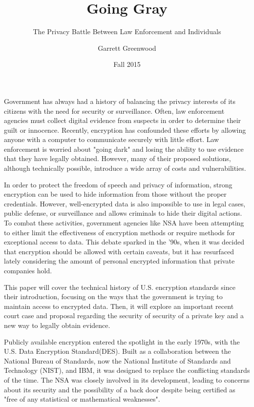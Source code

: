 \documentclass[12pt]{turabian-researchpaper}
\title{Going Gray}
\subtitle{The Privacy Battle Between Law Enforcement and Individuals}
\author{Garrett Greenwood}
\date{Fall 2015}
\begin{document}
\maketitle


Government has always had a history of balancing the privacy interests of its citizens with the need for security or surveillance.
Often, law enforcement agencies must collect digital evidence from suspects in order to determine their guilt or innocence.
Recently, encryption has confounded these efforts by allowing anyone with a computer to communicate securely with little effort.
Law enforcement is worried about "going dark" and losing the ability to use evidence that they have legally obtained.
However, many of their proposed solutions, although technically possible, introduce a wide array of costs and vulnerabilities.

In order to protect the freedom of speech and privacy of information, strong encryption can be used to hide information from those without the proper credentials.
However, well-encrypted data is also impossible to use in legal cases, public defense, or surveillance and allows criminals to hide their digital actions.
To combat these activities, government agencies like NSA have been attempting to either limit the effectiveness of encryption methods or require methods for exceptional access to data.
This debate sparked in the '90s, when it was decided that encryption should be allowed with certain caveats, but it has resurfaced lately considering the amount of personal encrypted information that private companies hold.

This paper will cover the technical history of U.S. encryption standards since their introduction, focusing on the ways that the government is trying to maintain access to encrypted data.
Then, it will explore an important recent court case and proposal regarding the security of security of a private key and a new way to legally obtain evidence.

Publicly available encryption entered the spotlight in the early 1970s, with the U.S. Data Encryption Standard(DES).
Built as a collaboration between the National Bureau of Standards, now the National Institute of Standards and Technology (NIST), and IBM, it was designed to replace the conflicting standards of the time.
The NSA was closely involved in its development, leading to concerns about its security and the possibility of a back door despite being certified as "free of any statistical or mathematical weaknesses".
\end{document}
